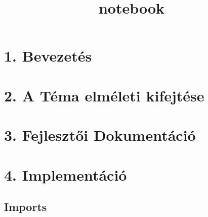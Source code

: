 \documentclass[11pt]{article}
\title{notebook}
\begin{document}
    
    \maketitle
    
    

    
    \section{1. Bevezetés}\label{bevezetuxe9s}

    \section{2. A Téma elméleti
kifejtése}\label{a-tuxe9ma-elmuxe9leti-kifejtuxe9se}

    \section{3. Fejlesztői
Dokumentáció}\label{fejlesztux151i-dokumentuxe1ciuxf3}

    \section{4. Implementáció}\label{implementuxe1ciuxf3}

    \subsection{Imports}\label{imports}
\end{document}
